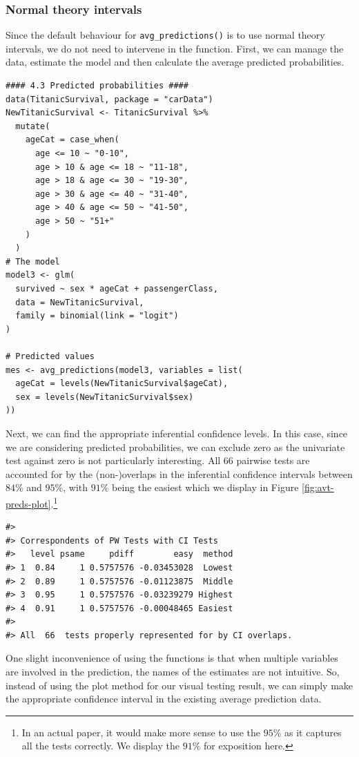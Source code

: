 \subsubsection{Normal theory intervals}\label{normal-theory-intervals}

Since the default behaviour for \texttt{avg\_predictions()} is to use normal theory intervals, we do not need to intervene in the function. First, we can manage the data, estimate the model and then calculate the average predicted probabilities.

\begin{verbatim}
#### 4.3 Predicted probabilities ####
data(TitanicSurvival, package = "carData")
NewTitanicSurvival <- TitanicSurvival %>%
  mutate(
    ageCat = case_when(
      age <= 10 ~ "0-10",
      age > 10 & age <= 18 ~ "11-18",
      age > 18 & age <= 30 ~ "19-30",
      age > 30 & age <= 40 ~ "31-40",
      age > 40 & age <= 50 ~ "41-50",
      age > 50 ~ "51+"
    )
  )
# The model
model3 <- glm(
  survived ~ sex * ageCat + passengerClass,
  data = NewTitanicSurvival,
  family = binomial(link = "logit")
)

# Predicted values
mes <- avg_predictions(model3, variables = list(
  ageCat = levels(NewTitanicSurvival$ageCat),
  sex = levels(NewTitanicSurvival$sex)
))
\end{verbatim}

Next, we can find the appropriate inferential confidence levels. In this case, since we are considering predicted probabilities, we can exclude zero as the univariate test against zero is not particularly interesting. All 66 pairwise tests are accounted for by the (non-)overlaps in the inferential confidence intervals between \(84\%\) and \(95\%\), with \(91\%\) being the easiest which we display in Figure \ref{fig:avt-preds-plot}.\footnote{In an actual paper, it would make more sense to use the \(95\%\) as it captures all the tests correctly. We display the \(91\%\) for exposition here.}

\begin{verbatim}
#> 
#> Correspondents of PW Tests with CI Tests
#>   level psame     pdiff        easy  method
#> 1  0.84     1 0.5757576 -0.03453028  Lowest
#> 2  0.89     1 0.5757576 -0.01123875  Middle
#> 3  0.95     1 0.5757576 -0.03239279 Highest
#> 4  0.91     1 0.5757576 -0.00048465 Easiest
#> 
#> All  66  tests properly represented for by CI overlaps.
\end{verbatim}

One slight inconvenience of using the  functions is that when multiple variables are involved in the prediction, the names of the estimates are not intuitive. So, instead of using the plot method for our visual testing result, we can simply make the appropriate confidence interval in the existing average prediction data.

